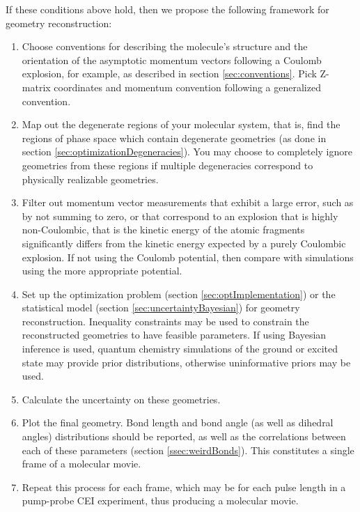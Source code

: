 If these conditions above hold, then we propose the following framework for geometry reconstruction:
\begin{enumerate}
  \item Choose conventions for describing the molecule's structure and the orientation of the asymptotic momentum vectors following a Coulomb explosion, for example, as described in section \ref{sec:conventions}. Pick Z-matrix coordinates and momentum convention following a generalized convention.
  \item Map out the degenerate regions of your molecular system, that is, find the regions of phase space which contain degenerate geometries (as done in section \ref{sec:optimizationDegeneracies}). You may choose to completely ignore geometries from these regions if multiple degeneracies correspond to physically realizable geometries.
  \item Filter out momentum vector measurements that exhibit a large error, such as by not summing to zero, or that correspond to an explosion that is highly non-Coulombic, that is the kinetic energy of the atomic fragments significantly differs from the kinetic energy expected by a purely Coulombic explosion. If not using the Coulomb potential, then compare with simulations using the more appropriate potential.
  \item Set up the optimization problem (section \ref{sec:optImplementation}) or the statistical model (section \ref{sec:uncertaintyBayesian}) for geometry reconstruction. Inequality constraints may be used to constrain the reconstructed geometries to have feasible parameters. If using Bayesian inference is used, quantum chemistry simulations of the ground or excited state may provide prior distributions, otherwise uninformative priors may be used.
  \item Calculate the uncertainty on these geometries.
  \item Plot the final geometry. Bond length and bond angle (as well as dihedral angles) distributions should be reported, as well as the correlations between each of these parameters (section \ref{ssec:weirdBonds}). This constitutes a single frame of a molecular movie.
  \item Repeat this process for each frame, which may be for each pulse length in a pump-probe CEI experiment, thus producing a molecular movie.
\end{enumerate}

